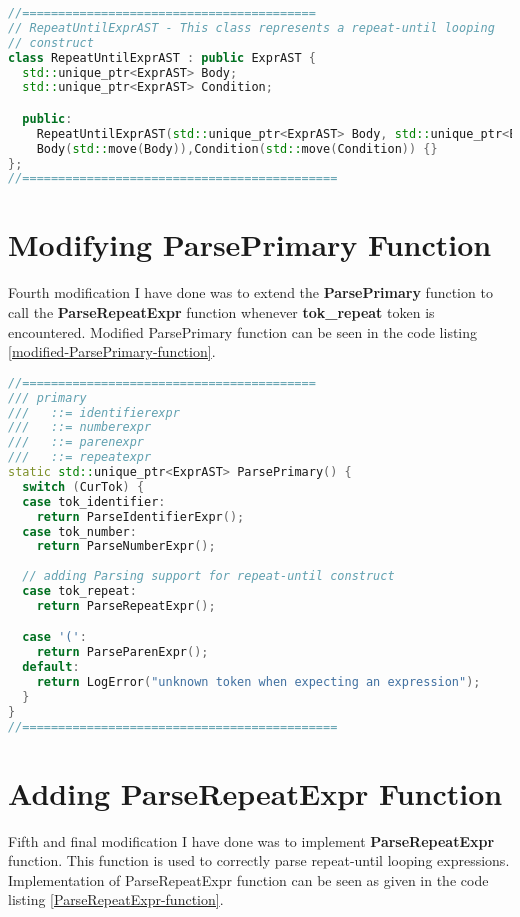 \documentclass[16pt]{article}
\begin{document}
\vspace{2.5pt}
\begin{lstlisting}[caption= Adding RepeatUntilExprAST for representing parsed repeat-until loop construct,label=RepeatUntilExprAST,
style=chstyle,language=C++]
//=========================================
// RepeatUntilExprAST - This class represents a repeat-until looping 
// construct
class RepeatUntilExprAST : public ExprAST {
  std::unique_ptr<ExprAST> Body;
  std::unique_ptr<ExprAST> Condition;

  public: 
    RepeatUntilExprAST(std::unique_ptr<ExprAST> Body, std::unique_ptr<ExprAST> Condition) : 
    Body(std::move(Body)),Condition(std::move(Condition)) {}
};
//============================================
\end{lstlisting}


\section{Modifying ParsePrimary Function}
Fourth modification I have done was to extend the \textbf{ParsePrimary} function to call the \textbf{ParseRepeatExpr} function whenever \textbf{tok\_repeat} token is encountered. Modified ParsePrimary function can be seen in the code listing \ref{modified-ParsePrimary-function}. 

\vspace{2.5pt}
\begin{lstlisting}[caption=Modifying ParsePrimary function to add parsing support for repeat-until construct, label=modified-ParsePrimary-function,
style=chstyle,language=C++]
//=========================================
/// primary
///   ::= identifierexpr
///   ::= numberexpr
///   ::= parenexpr
///   ::= repeatexpr
static std::unique_ptr<ExprAST> ParsePrimary() {
  switch (CurTok) {
  case tok_identifier:
    return ParseIdentifierExpr();
  case tok_number:
    return ParseNumberExpr();
    
  // adding Parsing support for repeat-until construct
  case tok_repeat: 
    return ParseRepeatExpr();

  case '(':
    return ParseParenExpr();
  default:
    return LogError("unknown token when expecting an expression");
  }
}
//============================================
\end{lstlisting}


\section{Adding ParseRepeatExpr Function}
Fifth and final modification I have done was to implement \textbf{ParseRepeatExpr} function. This function is used to correctly parse repeat-until looping expressions. Implementation of ParseRepeatExpr function can be seen as given in the code listing \ref{ParseRepeatExpr-function}.
\end{document}
